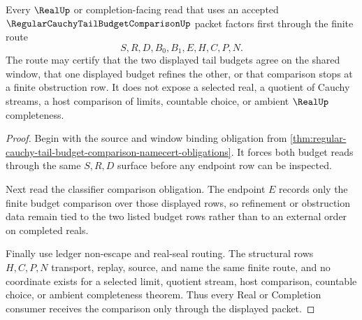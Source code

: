 \begin{theorem}
\label{thm:regular-cauchy-tail-budget-comparison-real-seal-route}
Every $\RealUp$ or completion-facing read that uses an accepted $\RegularCauchyTailBudgetComparisonUp$ packet factors first through the finite route
$$
S,R,D,B_0,B_1,E,H,C,P,N .
$$
The route may certify that the two displayed tail budgets agree on the shared window, that one displayed budget refines the other, or that comparison stops at a finite obstruction row. It does not expose a selected real, a quotient of Cauchy streams, a host comparison of limits, countable choice, or ambient $\RealUp$ completeness.
\end{theorem}
\begin{proof}
Begin with the source and window binding obligation from \autoref{thm:regular-cauchy-tail-budget-comparison-namecert-obligations}. It forces both budget reads through the same $S,R,D$ surface before any endpoint row can be inspected.

Next read the classifier comparison obligation. The endpoint $E$ records only the finite budget comparison over those displayed rows, so refinement or obstruction data remain tied to the two listed budget rows rather than to an external order on completed reals.

Finally use ledger non-escape and real-seal routing. The structural rows $H,C,P,N$ transport, replay, source, and name the same finite route, and no coordinate exists for a selected limit, quotient stream, host comparison, countable choice, or ambient completeness theorem. Thus every Real or Completion consumer receives the comparison only through the displayed packet.
\end{proof}


\begin{closurestatus}{\RegularCauchyTailBudgetComparisonUp}
  \theoryclosure{\seedClosure}
  \formalstatus{\unformalizedV}
\end{closurestatus}
